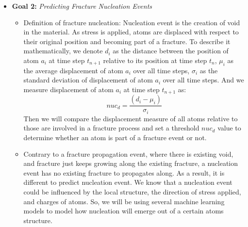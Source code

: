 \begin{itemize}
\item \textbf{Goal 2:} \emph{Predicting Fracture Nucleation Events} 
\begin{itemize} 
    \item Definition of fracture nucleation: Nucleation event is the creation of void in the material. As stress is applied, atoms are displaced with respect to their original position and becoming part of a fracture. To describe it mathematically, we denote $d_i$ as the distance between the position of atom $a_i$ at time step $t_{n+1}$ relative to its position at time step $t_{n}$, $\mu_i$ as the average displacement of atom $a_i$ over all time steps, $\sigma_i$ as the standard deviation of displacement of atom $a_i$ over all time steps. And we measure displacement of atom $a_i$ at time step $t_{n+1}$ as:
    \[
    nuc_d = \frac{(d_i - \mu_i)}{\sigma_i}
    \]
    Then we will compare the displacement measure of all atoms relative to those are involved in a fracture process and set a threshold $nuc_d$ value to determine whether an atom is part of a fracture event or not.
    \item Contrary to a fracture propagation event, where there is existing void, and fracture just keeps growing along the existing fracture, a nucleation event has no existing fracture to propagates along. As a result, it is different to predict nucleation event. We know that a nucleation event could be influenced by the local structure, the direction of stress applied, and charges of atoms. So, we will be using several machine learning models to model how nucleation will emerge out of a certain atoms structure. 
\end{itemize}
\end{itemize}

